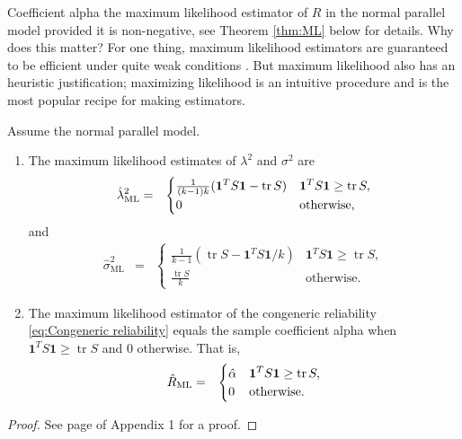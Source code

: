 \documentclass[twoside]{article}
\DeclareMathOperator{\tr}{tr}
\begin{document}
Coefficient alpha the maximum likelihood estimator of $ R$ in the normal parallel model provided it is non-negative, see Theorem \ref{thm:ML} below for details. Why does this matter? For one thing, maximum likelihood estimators are guaranteed to be efficient under quite weak conditions \citep[][Section 7.3]{Lehmann2004-ke}. But maximum likelihood also has an heuristic justification; maximizing likelihood is an intuitive procedure and is the most popular recipe for making estimators.

\begin{thm}\label{thm:ML}
Assume the normal parallel model.
\begin{enumerate}[label=(\roman*)]
\item The maximum likelihood estimates of $\lambda^{2}$
and $\sigma^{2}$ are 
\begin{eqnarray*}
\hat{\lambda}^2_\textrm{ML} & = & \begin{cases}
\frac{1}{(k-1)k}(\boldsymbol{1}^{T}S\boldsymbol{1}-\tr{S}) & \boldsymbol{1}^{T}S\boldsymbol{1}\geq\tr{S},\\
0 & \text{\textrm{otherwise}},
\end{cases}\\
\end{eqnarray*}
and
\begin{eqnarray*}
\hat{\sigma}^2_\textrm{ML} & = & \begin{cases}
\frac{1}{k-1}(\tr{S}-\boldsymbol{1}^{T}S\boldsymbol{1}/k) & \boldsymbol{1}^{T}S\boldsymbol{1}\geq\tr{S},\\
\frac{\tr{S}}{k} & \textrm{otherwise}.
\end{cases}
\end{eqnarray*}
\item The maximum likelihood estimator of the congeneric reliability
\eqref{eq:Congeneric reliability} equals the sample coefficient alpha
when $\boldsymbol{1}^{T}S\boldsymbol{1}\geq\tr{S}$ and $0$ otherwise. That is,
\begin{eqnarray*}
\hat{ R}_\textrm{ML} & = & \begin{cases}
\hat{\alpha} & \boldsymbol{1}^{T}S\boldsymbol{1}\geq\tr{S},\\
0 & \text{\textrm{otherwise}}.
\end{cases}
\end{eqnarray*}
\end{enumerate}
\end{thm}
\begin{proof}
See page \pageref{proof:ML} of Appendix 1 for a proof. 
\end{proof}
\end{document}
